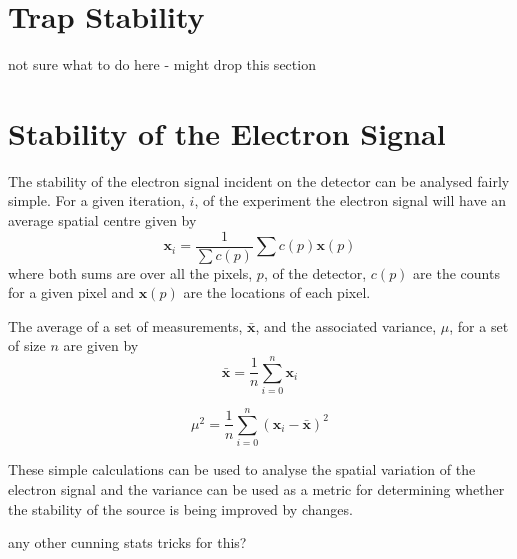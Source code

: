 \section{Trap Stability}
{\color{red} not sure what to do here - might drop this section}
\section{Stability of the Electron Signal}

The stability of the electron signal incident on the detector can be analysed fairly simple. For a given iteration, $i$, of the experiment the electron signal will have an average spatial centre given by
\begin{equation}\label{eq:weight_average_spatial}
\boldsymbol{x}_i = \frac{1}{\sum c(p)} \sum c(p) \boldsymbol x(p)
\end{equation}
where both sums are over all the pixels, $p$, of the detector, $c(p)$ are the counts for a given pixel and $\boldsymbol x(p)$ are the locations of each pixel.

The average of a set of measurements, $\bar{\boldsymbol{x}}$, and the associated variance, $\mu$, for a set of size $n$ are given by
\begin{equation}\label{eq:average_spatial}
\bar{\boldsymbol{x}} = \frac{1}{n} \sum_{i=0}^{n} \boldsymbol{x}_i
\end{equation}

\begin{equation}\label{eq:variance}
\mu^2 = \frac{1}{n} \sum_{i=0}^{n} (\boldsymbol{x}_i - \bar{\boldsymbol{x}})^2
\end{equation}

These simple calculations can be used to analyse the spatial variation of the electron signal and the variance can be used as a metric for determining whether the stability of the source is being improved by changes.

{\color{red} any other cunning stats tricks for this?}
